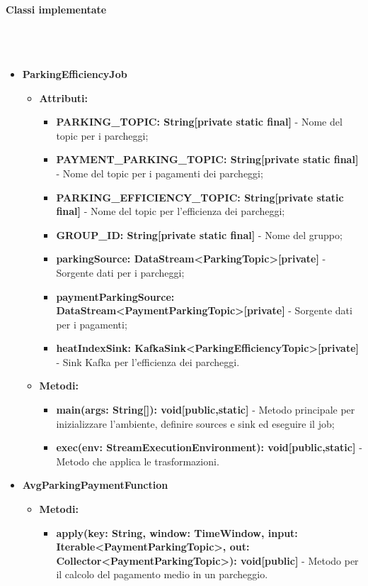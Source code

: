 \documentclass[8pt]{article}
\newcommand{\subsubsubsection}[1]{\paragraph{#1}\mbox{}\\\\}
\begin{document}
\subsubsubsection{Classi implementate}
\begin{itemize}
    \item \textbf{ParkingEfficiencyJob}
    \begin{itemize}
        \item \textbf{Attributi:}
        \begin{itemize}
            \item \textbf{PARKING\_TOPIC: String[private static final]} - Nome del topic per i parcheggi;
            \item \textbf{PAYMENT\_PARKING\_TOPIC: String[private static final]} - Nome del topic per i pagamenti dei parcheggi;
            \item \textbf{PARKING\_EFFICIENCY\_TOPIC: String[private static final]} - Nome del topic per l'efficienza dei parcheggi;
            \item \textbf{GROUP\_ID: String[private static final]} - Nome del gruppo;
            \item \textbf{parkingSource: DataStream<ParkingTopic>[private]} - Sorgente dati per i parcheggi;
            \item \textbf{paymentParkingSource: DataStream<PaymentParkingTopic>[private]} - Sorgente dati per i pagamenti;
            \item \textbf{heatIndexSink: KafkaSink<ParkingEfficiencyTopic>[private]} - Sink Kafka per l'efficienza dei parcheggi.
        \end{itemize}
    \end{itemize}
    \begin{itemize}
        \item \textbf{Metodi:}
        \begin{itemize}
            \item \textbf{main(args: String[]): void[public,static]} - Metodo principale per inizializzare l'ambiente, definire sources e sink ed eseguire il job;
            \item \textbf{exec(env: StreamExecutionEnvironment): void[public,static]} - Metodo che applica le trasformazioni.
        \end{itemize}
    \end{itemize}
    \item \textbf{AvgParkingPaymentFunction}
    \begin{itemize}
        \item \textbf{Metodi:}
        \begin{itemize}
            \item \textbf{apply(key: String, window: TimeWindow, input: Iterable<PaymentParkingTopic>, out: Collector<PaymentParkingTopic>): void[public]} - Metodo per il calcolo del pagamento medio in un parcheggio.

\end{itemize}
\end{itemize}
\end{itemize}
\end{document}
